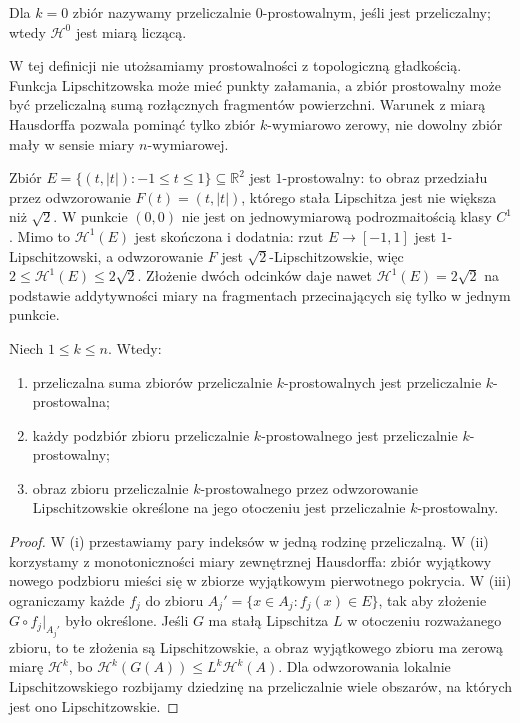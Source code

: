 Dla $k=0$ zbiór nazywamy przeliczalnie $0$-prostowalnym,
jeśli jest przeliczalny; wtedy $\mathcal H^0$ jest miarą liczącą.

W tej definicji nie utożsamiamy prostowalności z topologiczną
gładkością. Funkcja Lipschitzowska może mieć punkty załamania,
a zbiór prostowalny może być przeliczalną sumą rozłącznych
fragmentów powierzchni. Warunek z miarą Hausdorffa pozwala
pominąć tylko zbiór $k$-wymiarowo zerowy, nie dowolny zbiór
mały w sensie miary $n$-wymiarowej.

\begin{przyklad}
\label{ex:lip-graph-29}
Zbiór $E=\{(t,|t|):-1\le t\le1\}\subseteq\mathbb R^2$
jest $1$-prostowalny: to obraz przedziału przez odwzorowanie
$F(t)=(t,|t|)$, którego stała Lipschitza jest nie większa
niż $\sqrt2$. W punkcie $(0,0)$ nie jest on jednowymiarową
podrozmaitością klasy $C^1$. Mimo to $\mathcal H^1(E)$
jest skończona i dodatnia: rzut $E\to[-1,1]$ jest
$1$-Lipschitzowski, a odwzorowanie $F$ jest
$\sqrt2$-Lipschitzowskie, więc
$2\le\mathcal H^1(E)\le2\sqrt2$.
Złożenie dwóch odcinków daje nawet
$\mathcal H^1(E)=2\sqrt2$ na podstawie addytywności
miary na fragmentach przecinających się tylko w jednym punkcie.
\end{przyklad}

\begin{lemat}
\label{lem:rectifiable-union-29}
Niech $1\le k\le n$. Wtedy:
\begin{enumerate}[label=(\roman*)]
\item przeliczalna suma zbiorów przeliczalnie
$k$-prostowalnych jest przeliczalnie $k$-prostowalna;
\item każdy podzbiór zbioru przeliczalnie
$k$-prostowalnego jest przeliczalnie $k$-prostowalny;
\item obraz zbioru przeliczalnie $k$-prostowalnego
przez odwzorowanie Lipschitzowskie określone na jego
otoczeniu jest przeliczalnie $k$-prostowalny.
\end{enumerate}
\end{lemat}
\begin{proof}
W (i) przestawiamy pary indeksów w jedną rodzinę
przeliczalną. W (ii) korzystamy z monotoniczności
miary zewnętrznej Hausdorffa: zbiór wyjątkowy
nowego podzbioru mieści się w zbiorze wyjątkowym
pierwotnego pokrycia. W (iii) ograniczamy każde $f_j$ do zbioru
$A_j' = \{x\in A_j:f_j(x)\in E\}$, tak aby złożenie
$G\circ f_j|_{A_j'}$ było określone. Jeśli $G$ ma stałą
Lipschitza $L$ w otoczeniu rozważanego zbioru,
to te złożenia są Lipschitzowskie, a obraz
wyjątkowego zbioru ma zerową miarę $\mathcal H^k$,
bo $\mathcal H^k(G(A))\le L^k\mathcal H^k(A)$.
Dla odwzorowania lokalnie Lipschitzowskiego rozbijamy
dziedzinę na przeliczalnie wiele obszarów, na których
jest ono Lipschitzowskie.
\end{proof}

